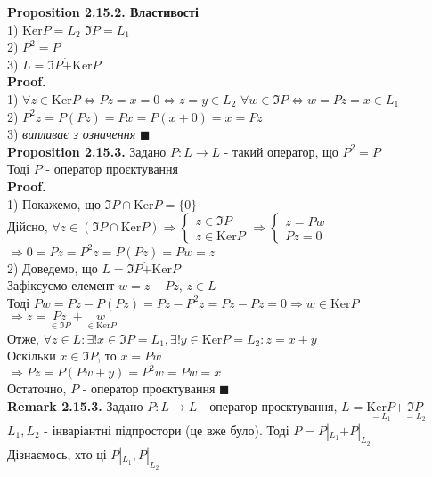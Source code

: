 \documentclass[a4paper, 10pt]{article}
\def\rm#1{\textbf{Remark {#1}}}
\def\prp#1{\textbf{Proposition {#1}}}
\def\proof{\textbf{Proof.}\\}
\def\qed{$\blacksquare$}
\def\ker#1{\textrm{Ker} {#1}}
\theoremstyle{theoremdd}
\theoremstyle{theoremdd}
\theoremstyle{theoremdd}
\theoremstyle{theoremdd}
\theoremstyle{theoremdd}
\theoremstyle{theoremdd}
\theoremstyle{theoremdd}
\theoremstyle{theoremdd}
\begin{document}
\prp{2.15.2. Властивості}\\
1) $\ker P = L_2$ \hspace{1cm} $\Im P = L_1$\\
2) $P^2 = P$\\
3) $L = \Im P \dot{+} \ker P$\\
\proof
1) $\forall z \in \ker P \iff Pz = x = 0 \iff z = y \in L_2$
$\forall w \in \Im P \iff w = Pz = x \in L_1$
\bigskip \\
2) $P^2z = P(Pz) = Px = P(x+0)=x=Pz$
\bigskip \\
3) \textit{випливає з означення} \qed
\bigskip \\
\prp{2.15.3.} Задано $P: L \to L$ - такий оператор, що $P^2 = P$\\
Тоді $P$ - оператор проєктування\\
\proof
1) Покажемо, що $\Im P \cap \ker P = \{0\}$\\
Дійсно, $\forall z \in (\Im P \cap \ker P) \Rightarrow \begin{cases} z \in \Im P \\ z \in \ker P \end{cases} \Rightarrow \begin{cases} z = Pw \\ Pz = 0 \end{cases}$\\
$\Rightarrow 0 = Pz = P^2z = P(Pz) = Pw = z$
\bigskip \\
2) Доведемо, що $L = \Im P \dot{+} \ker P$\\
Зафіксуємо елемент $w = z - Pz$, $z \in L$\\
Тоді $Pw = Pz - P(Pz) = Pz - P^2z = Pz - Pz = 0 \Rightarrow w \in \ker P$\\
$\Rightarrow z = \underset{\in \Im P}{Pz} + \underset{\in \ker P}{w}$\\
Отже, $\forall z \in L: \exists! x \in \Im P = L_1, \exists! y \in \ker P = L_2: z = x+y$\\
Оскільки $x \in \Im P$, то $x = Pw$\\
$\Rightarrow Pz = P(Pw+y) = P^2 w = Pw = x$\\
Остаточно, $P$ - оператор проєктування \qed
\bigskip \\
\rm{2.15.3.} Задано $P: L \to L$ - оператор проєктування, $L = \underset{=L_1}{\ker P} \dot{+} \underset{=L_2}{\Im P}$\\
$L_1,L_2$ - інваріантні підпростори (це вже було). Тоді $P = P|_{L_1} \dot{+} P|_{L_2}$\\
Дізнаємось, хто ці $P|_{L_1}, P|_{L_2}$\\
\end{document}
